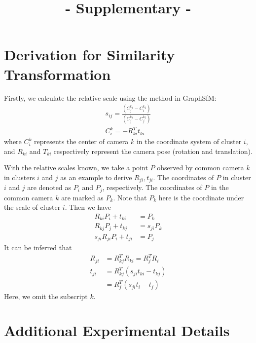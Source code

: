 \documentclass[runningheads]{llncs}
\begin{document}
%
\title{- Supplementary -}
%

\author{ } 


\maketitle              %
%
\section{Derivation for Similarity Transformation}

Firstly, we calculate the relative scale using the method in GraphSfM:
\begin{align}
s_{ij} = \frac {(C_j^{k_1} - C_i^{k_2})} {(C_j^{k_1} - C_j^{k_2})} \\
C_i^k = -R_{ki}^Tt_{ki}
\end{align} 
where $C_i^k$ represents the center of camera $k$ in the coordinate system of cluster $i$, and $R_{ki}$ and $T_{ki}$ respectively represent the camera pose (rotation and translation).

With the relative scales known, we take a point $P$ observed by common camera $k$ in clusters $i$ and $j$ as an example to derive $R_{ji},t_{ji}$. The coordinates of $P$ in cluster $i$ and $j$ are denoted as $P_i$ and $P_j$, respectively. The coordinates of $P$ in the common camera $k$ are marked as $P_k$. Note that $P_k$ here is the coordinate under the scale of cluster $i$. Then we have
\begin{align}
R_{ki}P_i + t_{ki} &= P_k \\
R_{kj}P_j + t_{kj} &= s_{ji}P_k \\
s_{ji}R_{ji}P_{i} + t_{ji} &= P_j
\end{align} 
It can be inferred that
\begin{align}
R_{ji} &= R_{kj}^TR_{ki} = R_{j}^TR_i \\ 
t_{ji} &= R_{kj}^T(s_{ji}t_{ki} - t_{kj}) \\
       &=R_{j}^T(s_{ji}t_{i} - t_{j})
\end{align} 
Here, we omit the subscript $k$.

\section{Additional Experimental Details}
\end{document}
